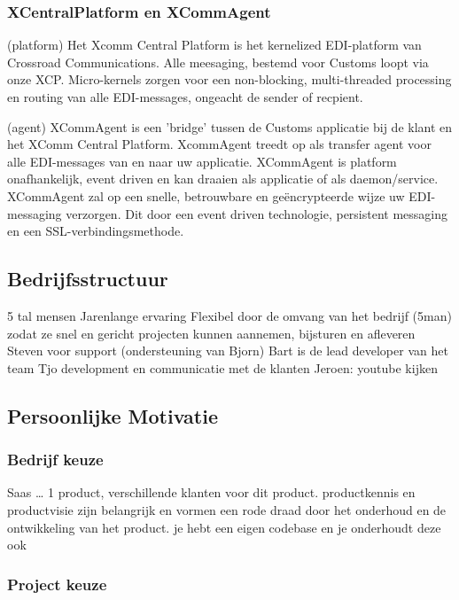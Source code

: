 \subsubsection {XCentralPlatform en XCommAgent}

(platform) Het Xcomm Central Platform is het kernelized EDI-platform van Crossroad
Communications.
Alle meesaging, bestemd voor Customs loopt via onze XCP.
Micro-kernels zorgen voor een non-blocking, multi-threaded processing en routing van alle
EDI-messages, ongeacht de sender of recpient.

(agent) XCommAgent is een 'bridge' tussen de Customs applicatie bij de klant en het XComm
Central Platform. XcommAgent treedt op als transfer agent voor alle EDI-messages van en
naar uw applicatie.
XCommAgent is platform onafhankelijk, event driven en kan draaien als applicatie of als
daemon/service.
XCommAgent zal op een snelle, betrouwbare en geëncrypteerde wijze uw EDI-messaging
verzorgen. Dit door een event driven technologie, persistent messaging en een
SSL-verbindingsmethode.


\subsection {Bedrijfsstructuur}

5 tal mensen
Jarenlange ervaring
Flexibel door de omvang van het bedrijf (5man) zodat ze snel en gericht projecten kunnen
aannemen, bijsturen en afleveren
Steven voor support (ondersteuning van Bjorn)
Bart is de lead developer van het team
Tjo development en communicatie met de klanten
Jeroen: youtube kijken

\subsection {Persoonlijke Motivatie}

\subsubsection {Bedrijf keuze}

Saas … 1 product, verschillende klanten voor dit product.
productkennis en productvisie zijn belangrijk en vormen een rode draad door het onderhoud
en de ontwikkeling van het product.
je hebt een eigen codebase en je onderhoudt deze ook

\subsubsection {Project keuze}

